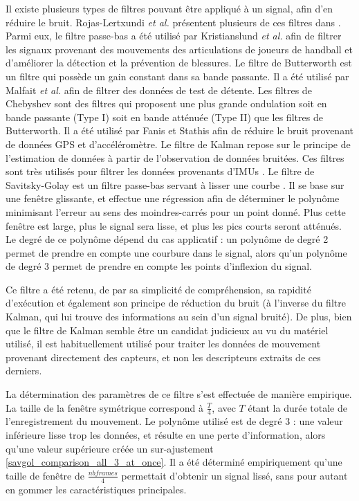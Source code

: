 Il existe plusieurs types de filtres pouvant être appliqué à un signal, afin d'en réduire le bruit. Rojas-Lertxundi \textit{et al.} présentent plusieurs de ces filtres dans \parencite{Rojas2015MCS}. Parmi eux, le filtre passe-bas a été utilisé par Kristianslund \textit{et al.} \parencite{KRISTIANSLUND2012Eol} afin de filtrer les signaux provenant des mouvements des articulations de joueurs de handball et d'améliorer la détection et la prévention de blessures. Le filtre de Butterworth est un filtre qui possède un gain constant dans sa bande passante. Il a été utilisé par Malfait \textit{et al.} \parencite{Malfait2014Hra} afin de filtrer des données de test de détente. Les filtres de Chebyshev sont des filtres qui proposent une plus grande ondulation soit en bande passante (Type I) soit en bande atténuée (Type II) que les filtres de Butterworth. Il a été utilisé par Fanis et Stathis \parencite{Moschas2011Mot} afin de réduire le bruit provenant de données GPS et d'accéléromètre. Le filtre de Kalman repose sur le principe de l'estimation de données à partir de l'observation de données bruitées. Ces filtres sont très utilisés pour filtrer les données provenants d'IMUs \parencite{Zihajehzadeh2014Act} \parencite{Marins2001AeK} \parencite{Luinge1999Eow}. Le filtre de Savitsky-Golay est un filtre passe-bas servant à lisser une courbe \parencite{Savitsky1964SaD}. Il se base sur une fenêtre glissante, et effectue une régression afin de déterminer le polynôme minimisant l'erreur au sens des moindres-carrés pour un point donné. Plus cette fenêtre est large, plus le signal sera lisse, et plus les pics courts seront atténués. Le degré de ce polynôme dépend du cas applicatif : un polynôme de degré 2 permet de prendre en compte une courbure dans le signal, alors qu'un polynôme de degré 3 permet de prendre en compte les points d'inflexion du signal.

Ce filtre a été retenu, de par sa simplicité de compréhension, sa rapidité d'exécution et également son principe de réduction du bruit (à l'inverse du filtre Kalman, qui lui trouve des informations au sein d'un signal bruité). De plus, bien que le filtre de Kalman semble être un candidat judicieux au vu du matériel utilisé, il est habituellement utilisé pour traiter les données de mouvement provenant directement des capteurs, et non les descripteurs extraits de ces derniers.

La détermination des paramètres de ce filtre s'est effectuée de manière empirique. La taille de la fenêtre symétrique correspond à $\frac{T}{4}$, avec $T$ étant la durée totale de l'enregistrement du mouvement. Le polynôme utilisé est de degré $3$ : une valeur inférieure lisse trop les données, et résulte en une perte d'information, alors qu'une valeur supérieure créée un sur-ajustement \ref{savgol_comparison_all_3_at_once}. Il a été déterminé empiriquement qu'une taille de fenêtre de $ \frac{nbframes}{4}$ permettait d'obtenir un signal lissé, sans pour autant en gommer les caractéristiques principales.

